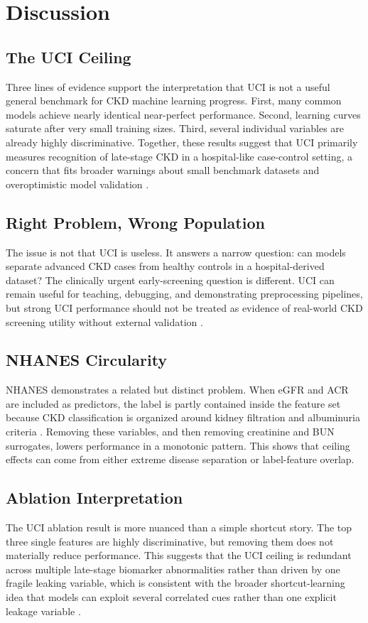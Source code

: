 \documentclass[12pt]{article}
\begin{document}
\section{Discussion}
\subsection{The UCI Ceiling}
Three lines of evidence support the interpretation that UCI is not a useful general benchmark for CKD machine learning progress. First, many common models achieve nearly identical near-perfect performance. Second, learning curves saturate after very small training sizes. Third, several individual variables are already highly discriminative. Together, these results suggest that UCI primarily measures recognition of late-stage CKD in a hospital-like case-control setting, a concern that fits broader warnings about small benchmark datasets and overoptimistic model validation \cite{vabalas2019,collins2024}.

\subsection{Right Problem, Wrong Population}
The issue is not that UCI is useless. It answers a narrow question: can models separate advanced CKD cases from healthy controls in a hospital-derived dataset? The clinically urgent early-screening question is different. UCI can remain useful for teaching, debugging, and demonstrating preprocessing pipelines, but strong UCI performance should not be treated as evidence of real-world CKD screening utility without external validation \cite{collins2024,zech2018}.

\subsection{NHANES Circularity}
NHANES demonstrates a related but distinct problem. When eGFR and ACR are included as predictors, the label is partly contained inside the feature set because CKD classification is organized around kidney filtration and albuminuria criteria \cite{kdigo2024}. Removing these variables, and then removing creatinine and BUN surrogates, lowers performance in a monotonic pattern. This shows that ceiling effects can come from either extreme disease separation or label-feature overlap.

\subsection{Ablation Interpretation}
The UCI ablation result is more nuanced than a simple shortcut story. The top three single features are highly discriminative, but removing them does not materially reduce performance. This suggests that the UCI ceiling is redundant across multiple late-stage biomarker abnormalities rather than driven by one fragile leaking variable, which is consistent with the broader shortcut-learning idea that models can exploit several correlated cues rather than one explicit leakage variable \cite{geirhos2020,ongly2024}.
\end{document}
